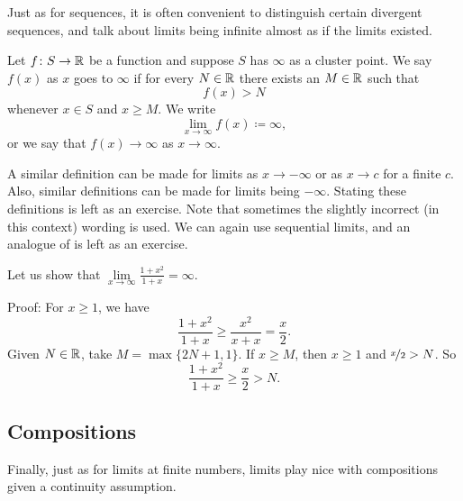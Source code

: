 Just as for sequences, it is often convenient to distinguish certain
divergent sequences, and talk about limits being infinite
almost as if the limits existed.

\begin{defn}
%
Let $f \colon S \to {\mathbb{R}}$ be a function and suppose 
$S$ has $\infty$ as a cluster point.
We say $f(x)$
\emph{} 
as $x$ goes to $\infty$
if for every $N \in {\mathbb{R}}$
there exists an $M \in {\mathbb{R}}$ such that
\begin{equation*}
f(x) > N
\end{equation*}
whenever $x \in S$ and $x \geq M$.
We write
\begin{equation*}
\lim_{x \to \infty} f(x) \coloneqq \infty ,
\end{equation*}
or we say that $f(x) \to \infty$ as $x \to \infty$.
\end{defn}

A similar definition can be made for limits as $x \to -\infty$
or as $x \to c$ for a finite $c$.  Also, similar definitions can be
made for limits being $-\infty$.  Stating these definitions is left
as an exercise.
Note that
sometimes the slightly incorrect (in this context)
wording
\emph{} is used.
We can again use sequential limits, and an analogue of 
 is left as an exercise.

\begin{example}
Let us show that $\lim\limits_{x \to \infty} \frac{1+x^2}{1+x} = \infty$.

Proof: For $x \geq 1$, we have
\begin{equation*}
\frac{1+x^2}{1+x} \geq 
\frac{x^2}{x+x}  = 
\frac{x}{2} .
\end{equation*}
Given $N \in {\mathbb{R}}$, take $M = \max \{ 2N+1 , 1 \}$.
If $x \geq M$, then $x \geq 1$ and $\nicefrac{x}{2} > N$.
So
\begin{equation*}
\frac{1+x^2}{1+x} \geq 
\frac{x}{2} > N .
\end{equation*}
\end{example}

\subsection{Compositions}

Finally, just as for limits at finite numbers,
limits play nice with compositions given a
continuity assumption.

